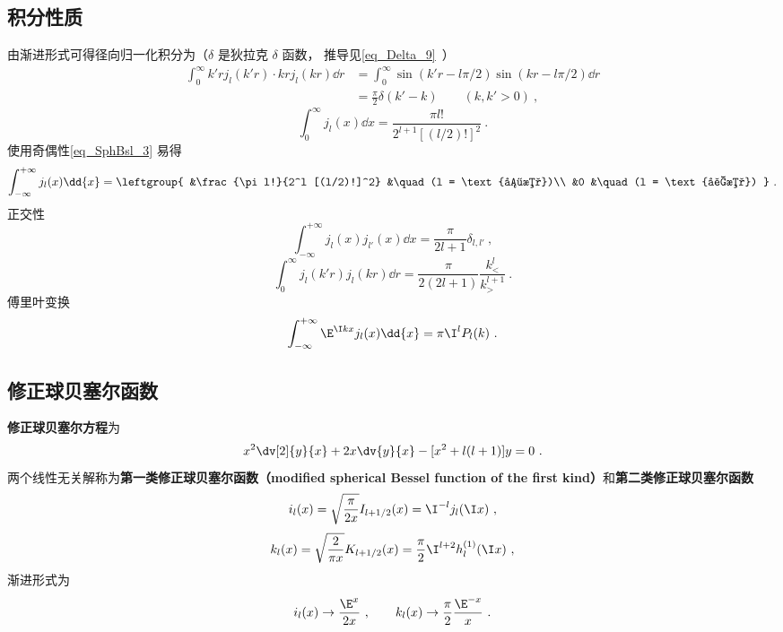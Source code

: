 \subsection{积分性质}
由渐进形式可得径向归一化积分为（$\delta$ 是狄拉克 $\delta$ 函数， 推导见\autoref{eq_Delta_9}~）
\begin{equation}\label{eq_SphBsl_4}
\begin{aligned}
\int_0^\infty k'r j_l(k'r) \cdot kr j_l(kr) \dd{r} &= \int_0^\infty \sin(k'r - l\pi/2)\sin(kr - l\pi/2) \dd{r}\\
& = \frac{\pi}{2}\delta(k'-k) \qquad (k, k' > 0)~,
\end{aligned}
\end{equation}
\begin{equation}
\int_{0}^{\infty} j_l(x) \dd{x} = \frac{\pi l!}{2^{l+1} [(l/2)!]^2}~.
\end{equation}
使用奇偶性\autoref{eq_SphBsl_3} 易得
\begin{equation}
\int_{-\infty}^{+\infty} j_l(x) \dd{x} = \leftgroup{
&\frac{\pi l!}{2^l [(l/2)!]^2} &\quad (l = \text{偶数})\\
&0 &\quad (l = \text{奇数})
}~.\end{equation}
正交性
\begin{equation}
\int_{-\infty}^{+\infty} j_l(x) j_{l'}(x) \dd{x} = \frac{\pi}{2l+1}\delta_{l,l'}~,
\end{equation}
\begin{equation}
\int_0^\infty j_l(k' r) j_l(kr) \dd{r} = \frac{\pi}{2(2l+1)} \frac{k_<^l}{k_>^{l+1}}~.
\end{equation}
傅里叶变换
\begin{equation}
\int_{-\infty}^{+\infty} \E^{\I k x} j_l(x) \dd{x} = \pi \I^l P_l(k)~.
\end{equation}

\subsection{修正球贝塞尔函数}

\textbf{修正球贝塞尔方程}为
\begin{equation}
x^2 \dv[2]{y}{x} + 2x\dv{y}{x} - [x^2 + l(l + 1)]y = 0~.
\end{equation}
两个线性无关解称为\textbf{第一类修正球贝塞尔函数（modified spherical Bessel function of the first kind）}和\textbf{第二类修正球贝塞尔函数}
\begin{equation}
i_l(x) = \sqrt{\frac{\pi }{2x}} I_{l+1/2}(x) = \I^{-l} j_l(\I x)~,
\end{equation}
\begin{equation}\label{eq_SphBsl_1}
k_l(x) = \sqrt{\frac{2}{\pi x}} K_{l+1/2}(x) = \frac{\pi }{2} \I^{l + 2} h_l^{(1)}(\I x)~,
\end{equation}
渐进形式为
\begin{equation}
i_l(x) \to \frac{\E^x}{2x}~,
\qquad
k_l(x) \to \frac{\pi}{2} \frac{\E^{-x}}{x}~.
\end{equation}
